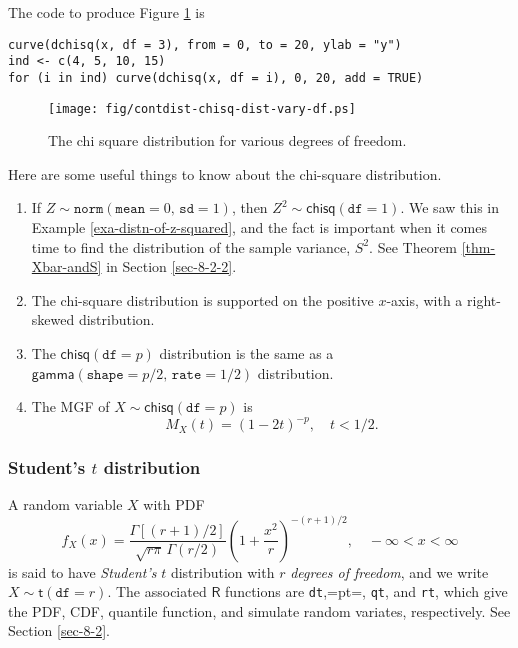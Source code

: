 The code to produce Figure \ref{fig-chisq-dist-vary-df} is

\begin{verbatim}
curve(dchisq(x, df = 3), from = 0, to = 20, ylab = "y")
ind <- c(4, 5, 10, 15)
for (i in ind) curve(dchisq(x, df = i), 0, 20, add = TRUE)
\end{verbatim}

\begin{figure}[ht!]
\centering
\texttt{[image: fig/contdist-chisq-dist-vary-df.ps]}
\caption[Chi square distribution for various degrees of freedom]{\label{fig-chisq-dist-vary-df}\small The chi square distribution for various degrees of freedom.}
\end{figure}

\begin{rem}
Here are some useful things to know about the chi-square distribution.
\begin{enumerate}
\item If \(Z\sim\mathtt{norm}(\mathtt{mean}=0,\,\mathtt{sd}=1)\), then
\(Z^{2}\sim\mathsf{chisq}(\mathtt{df}=1)\). We saw this in Example
\ref{exa-distn-of-z-squared}, and the fact is important when it
comes time to find the distribution of the sample variance,
\(S^{2}\). See Theorem \ref{thm-Xbar-andS} in Section
\ref{sec-8-2-2}.
\item The chi-square distribution is supported on the positive
\(x\)-axis, with a right-skewed distribution.
\item The \(\mathsf{chisq}(\mathtt{df}=p)\) distribution is the same as a
\(\mathsf{gamma}(\mathtt{shape}=p/2,\,\mathtt{rate}=1/2)\)
distribution.
\item The MGF of \(X\sim\mathsf{chisq}(\mathtt{df}=p)\) is
\begin{equation}
\label{eq-mgf-chisq}
M_{X}(t)=\left(1-2t\right)^{-p},\quad t < 1/2.
\end{equation}
\end{enumerate}
\end{rem}

\subsubsection{Student's \(t\) distribution}
\label{sec-6-5-2-2}

A random variable \(X\) with PDF
\begin{equation}
f_{X}(x) = \frac{\Gamma\left[ (r+1)/2\right] }{\sqrt{r\pi}\,\Gamma(r/2)}\left( 1 + \frac{x^{2}}{r} \right)^{-(r+1)/2},\quad -\infty < x < \infty
\end{equation}
is said to have \emph{Student's} \(t\) distribution with \(r\) \emph{degrees of
freedom}, and we write \(X\sim\mathsf{t}(\mathtt{df}=r)\). The
associated \(\mathsf{R}\) functions are \texttt{dt},=pt=, \texttt{qt}, and \texttt{rt},
which give the PDF, CDF, quantile function, and simulate random
variates, respectively. See Section \ref{sec-8-2}.


